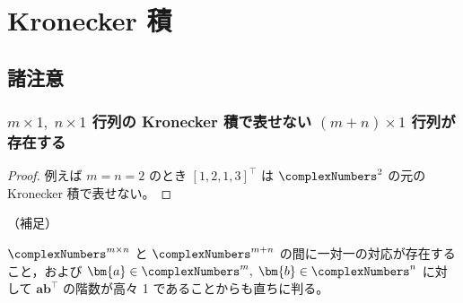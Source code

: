     \section{Kronecker 積}
        \subsection{諸注意}
            \subsubsection{\texorpdfstring{$m\times 1,\;n\times 1$}{m×1,n×1} 行列の Kronecker 積で表せない \texorpdfstring{$(m+n)\times 1$}{(m+n)×1} 行列が存在する}
            \begin{proof}
                例えば $m=n=2$ のとき $[1, 2, 1, 3]^\top$ は $\complexNumbers^2$ の元の Kronecker 積で表せない。
            \end{proof}
            （補足）
            \par
            $\complexNumbers^{m\times n}$ と $\complexNumbers^{m+n}$ の間に一対一の対応が存在すること，および $\bm{a}\in\complexNumbers^m,\;\bm{b}\in\complexNumbers^n$ に対して $\bm{a}\bm{b}^\top$ の階数が高々 1 であることからも直ちに判る。
